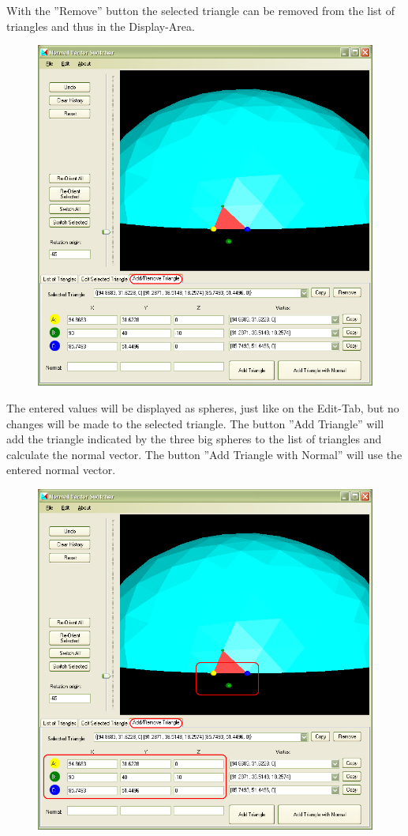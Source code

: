 With the ''Remove'' button the selected triangle can be removed from the list of triangles and thus in the Display-Area.

\begin{figure}[htb]
	\centering
	\includegraphics[width=0.9\linewidth]{window9}
\end{figure}

\newpage
\noindent
The entered values will be displayed as spheres, just like on the Edit-Tab, but no changes will be made to the selected triangle. The button ''Add Triangle'' will add the triangle indicated by the three big spheres to the list of triangles and calculate the normal vector. The button ''Add Triangle with Normal'' will use the entered normal vector.

\begin{figure}[htb]
	\centering
	\includegraphics[width=0.9\linewidth]{window10}
\end{figure}

